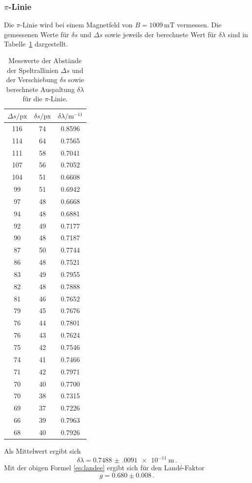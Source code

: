 \subsubsection*{$\pi$-Linie}
Die $\pi$-Linie wird bei einem Magnetfeld von $B = 1009 \, \si{\milli\tesla}$ vermessen.
Die gemessenen Werte für 
$\delta s$ und $\Delta s$ sowie jeweils der berechnete Wert für $\delta \lambda$ sind in Tabelle \ref{tab:atab3} dargestellt.
\FloatBarrier
\begin{table}[h]
    \centering
    \caption{Messwerte der Abstände der Speltrallinien $\Delta s$ und der Verschiebung $\delta s$ sowie berechnete Auspaltung $\delta \lambda$ für die $\pi$-Linie.}
    \label{tab:atab3}
    \begin{tabular}{c c c}
        \toprule
        {$\Delta s / \text{px}$} & {$\delta s / \text{px}$} & {$\delta \lambda / \si{\meter}^{-11}$}\\
        \midrule
        116 & 74 & 0.8596 \\
        114 & 64 & 0.7565 \\
        111 & 58 & 0.7041 \\
        107 & 56 & 0.7052 \\
        104 & 51 & 0.6608 \\
        99  & 51 & 0.6942 \\
        97  & 48 & 0.6668 \\
        94  & 48 & 0.6881 \\
        92  & 49 & 0.7177 \\
        90  & 48 & 0.7187 \\
        87  & 50 & 0.7744 \\
        86  & 48 & 0.7521 \\
        83  & 49 & 0.7955 \\
        82  & 48 & 0.7888 \\
        81  & 46 & 0.7652 \\
        79  & 45 & 0.7676 \\
        76  & 44 & 0.7801 \\
        76  & 43 & 0.7624 \\
        75  & 42 & 0.7546 \\
        74  & 41 & 0.7466 \\
        71  & 42 & 0.7971 \\
        70  & 40 & 0.7700 \\
        70  & 38 & 0.7315 \\
        69  & 37 & 0.7226 \\
        66  & 39 & 0.7963 \\
        68  & 40 & 0.7926 \\
        \bottomrule
    \end{tabular}
\end{table}
\FloatBarrier
\noindent
Als Mittelwert ergibt sich
\begin{equation*}
    \delta \lambda = \SI{0.7488(0091)e-11}{\meter} \, .
\end{equation*}
Mit der obigen Formel \eqref{eq:landee} ergibt sich für den Landé-Faktor
\begin{equation*}
    g = 0.680 \pm 0.008 \, .
\end{equation*}

